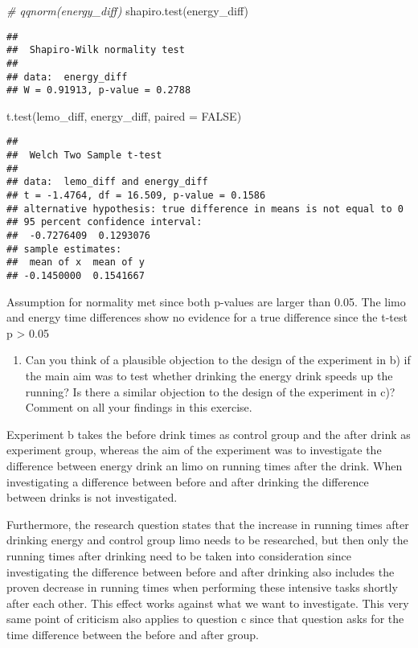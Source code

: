 \documentclass[
]{article}
\newenvironment{Shaded}{\begin{snugshade}}{\end{snugshade}}
\newcommand{\AttributeTok}[1]{\textcolor[rgb]{0.77,0.63,0.00}{#1}}
\newcommand{\CommentTok}[1]{\textcolor[rgb]{0.56,0.35,0.01}{\textit{#1}}}
\newcommand{\ConstantTok}[1]{\textcolor[rgb]{0.00,0.00,0.00}{#1}}
\newcommand{\FunctionTok}[1]{\textcolor[rgb]{0.00,0.00,0.00}{#1}}
\newcommand{\NormalTok}[1]{#1}
\providecommand{\tightlist}{%
  \setlength{\itemsep}{0pt}\setlength{\parskip}{0pt}}
\begin{document}
\begin{Shaded}
\begin{Highlighting}[]
\CommentTok{\# qqnorm(energy\_diff)}
\FunctionTok{shapiro.test}\NormalTok{(energy\_diff)}
\end{Highlighting}
\end{Shaded}

\begin{verbatim}
## 
##  Shapiro-Wilk normality test
## 
## data:  energy_diff
## W = 0.91913, p-value = 0.2788
\end{verbatim}

\begin{Shaded}
\begin{Highlighting}[]
\FunctionTok{t.test}\NormalTok{(lemo\_diff, energy\_diff, }\AttributeTok{paired =} \ConstantTok{FALSE}\NormalTok{)}
\end{Highlighting}
\end{Shaded}

\begin{verbatim}
## 
##  Welch Two Sample t-test
## 
## data:  lemo_diff and energy_diff
## t = -1.4764, df = 16.509, p-value = 0.1586
## alternative hypothesis: true difference in means is not equal to 0
## 95 percent confidence interval:
##  -0.7276409  0.1293076
## sample estimates:
##  mean of x  mean of y 
## -0.1450000  0.1541667
\end{verbatim}

Assumption for normality met since both p-values are larger than 0.05.
The limo and energy time differences show no evidence for a true
difference since the t-test p \textgreater{} 0.05

\begin{enumerate}
\def\labelenumi{\alph{enumi})}
\setcounter{enumi}{3}
\tightlist
\item
  Can you think of a plausible objection to the design of the experiment
  in b) if the main aim was to test whether drinking the energy drink
  speeds up the running? Is there a similar objection to the design of
  the experiment in c)? Comment on all your findings in this exercise.
\end{enumerate}

Experiment b takes the before drink times as control group and the after
drink as experiment group, whereas the aim of the experiment was to
investigate the difference between energy drink an limo on running times
after the drink. When investigating a difference between before and
after drinking the difference between drinks is not investigated.

Furthermore, the research question states that the increase in running
times after drinking energy and control group limo needs to be
researched, but then only the running times after drinking need to be
taken into consideration since investigating the difference between
before and after drinking also includes the proven decrease in running
times when performing these intensive tasks shortly after each other.
This effect works against what we want to investigate. This very same
point of criticism also applies to question c since that question asks
for the time difference between the before and after group.
\end{document}
